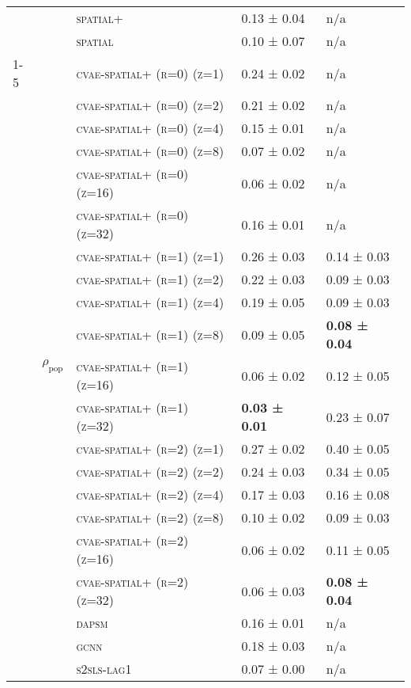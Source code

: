 \documentclass{article}
\begin{document}
\begin{table}[!tbp]
\begin{tabular}{lllll}
 &  & \textsc{spatial+} & 0.13 ± { 0.04} & n/a \\
 &  & \textsc{spatial} & 0.10 ± { 0.07} & n/a \\
\cline{1-5} \cline{2-5}
\multirow[t]{46}{*}{$ (LC)\; PM\_{2.5} \;\to\; m \;(r=2) $} & \multirow[t]{23}{*}{$\rho_{\text{pop}}$} & \textsc{cvae-spatial+ (r=0) (z=1)} & 0.24 ± { 0.02} & n/a \\
 &  & \textsc{cvae-spatial+ (r=0) (z=2)} & 0.21 ± { 0.02} & n/a \\
 &  & \textsc{cvae-spatial+ (r=0) (z=4)} & 0.15 ± { 0.01} & n/a \\
 &  & \textsc{cvae-spatial+ (r=0) (z=8)} & 0.07 ± { 0.02} & n/a \\
 &  & \textsc{cvae-spatial+ (r=0) (z=16)} & 0.06 ± { 0.02} & n/a \\
 &  & \textsc{cvae-spatial+ (r=0) (z=32)} & 0.16 ± { 0.01} & n/a \\
 &  & \textsc{cvae-spatial+ (r=1) (z=1)} & 0.26 ± { 0.03} & 0.14 ± { 0.03} \\
 &  & \textsc{cvae-spatial+ (r=1) (z=2)} & 0.22 ± { 0.03} & 0.09 ± { 0.03} \\
 &  & \textsc{cvae-spatial+ (r=1) (z=4)} & 0.19 ± { 0.05} & 0.09 ± { 0.03} \\
 &  & \textsc{cvae-spatial+ (r=1) (z=8)} & 0.09 ± { 0.05} & \bf 0.08 ± { 0.04} \\
 &  & \textsc{cvae-spatial+ (r=1) (z=16)} & 0.06 ± { 0.02} & 0.12 ± { 0.05} \\
 &  & \textsc{cvae-spatial+ (r=1) (z=32)} & \bf 0.03 ± { 0.01} & 0.23 ± { 0.07} \\
 &  & \textsc{cvae-spatial+ (r=2) (z=1)} & 0.27 ± { 0.02} & 0.40 ± { 0.05} \\
 &  & \textsc{cvae-spatial+ (r=2) (z=2)} & 0.24 ± { 0.03} & 0.34 ± { 0.05} \\
 &  & \textsc{cvae-spatial+ (r=2) (z=4)} & 0.17 ± { 0.03} & 0.16 ± { 0.08} \\
 &  & \textsc{cvae-spatial+ (r=2) (z=8)} & 0.10 ± { 0.02} & 0.09 ± { 0.03} \\
 &  & \textsc{cvae-spatial+ (r=2) (z=16)} & 0.06 ± { 0.02} & 0.11 ± { 0.05} \\
 &  & \textsc{cvae-spatial+ (r=2) (z=32)} & 0.06 ± { 0.03} & \bf 0.08 ± { 0.04} \\
 &  & \textsc{dapsm} & 0.16 ± { 0.01} & n/a \\
 &  & \textsc{gcnn} & 0.18 ± { 0.03} & n/a \\
 &  & \textsc{s2sls-lag1} & 0.07 ± { 0.00} & n/a \\

\end{tabular}
\end{table}
\end{document}
